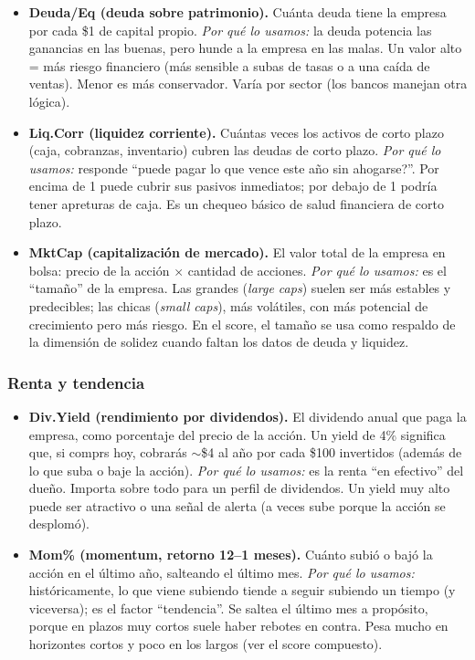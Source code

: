 \documentclass[11pt,a4paper]{article}
\begin{document}
\begin{itemize}[leftmargin=1.4em]
  \item \textbf{Deuda/Eq (deuda sobre patrimonio).} Cu\'anta deuda tiene la empresa por
  cada \$1 de capital propio. \emph{Por qu\'e lo usamos:} la deuda potencia las
  ganancias en las buenas, pero hunde a la empresa en las malas. Un valor alto = m\'as
  riesgo financiero (m\'as sensible a subas de tasas o a una ca\'ida de ventas). Menor
  es m\'as conservador. Var\'ia por sector (los bancos manejan otra l\'ogica).
  \item \textbf{Liq.Corr (liquidez corriente).} Cu\'antas veces los activos de corto
  plazo (caja, cobranzas, inventario) cubren las deudas de corto plazo. \emph{Por qu\'e
  lo usamos:} responde ``\textquestiondown{}puede pagar lo que vence este a\~no sin ahogarse?''.
  Por encima de 1 puede cubrir sus pasivos inmediatos; por debajo de 1 podr\'ia tener
  apreturas de caja. Es un chequeo b\'asico de salud financiera de corto plazo.
  \item \textbf{MktCap (capitalizaci\'on de mercado).} El valor total de la empresa en
  bolsa: precio de la acci\'on $\times$ cantidad de acciones. \emph{Por qu\'e lo
  usamos:} es el ``tama\~no'' de la empresa. Las grandes (\emph{large caps}) suelen ser
  m\'as estables y predecibles; las chicas (\emph{small caps}), m\'as vol\'atiles, con
  m\'as potencial de crecimiento pero m\'as riesgo. En el score, el tama\~no se usa como
  respaldo de la dimensi\'on de solidez cuando faltan los datos de deuda y liquidez.
\end{itemize}

\subsubsection*{Renta y tendencia}

\begin{itemize}[leftmargin=1.4em]
  \item \textbf{Div.Yield (rendimiento por dividendos).} El dividendo anual que paga la
  empresa, como porcentaje del precio de la acci\'on. Un yield de 4\% significa que, si
  comprs hoy, cobrar\'as $\sim$\$4 al a\~no por cada \$100 invertidos (adem\'as de lo que
  suba o baje la acci\'on). \emph{Por qu\'e lo usamos:} es la renta ``en efectivo'' del
  due\~no. Importa sobre todo para un perfil de dividendos. Un yield muy alto puede ser
  atractivo o una se\~nal de alerta (a veces sube porque la acci\'on se desplom\'o).
  \item \textbf{Mom\% (momentum, retorno 12--1 meses).} Cu\'anto subi\'o o baj\'o la
  acci\'on en el \'ultimo a\~no, salteando el \'ultimo mes. \emph{Por qu\'e lo usamos:}
  hist\'oricamente, lo que viene subiendo tiende a seguir subiendo un tiempo (y
  viceversa); es el factor ``tendencia''. Se saltea el \'ultimo mes a prop\'osito,
  porque en plazos muy cortos suele haber rebotes en contra. Pesa mucho en horizontes
  cortos y poco en los largos (ver el score compuesto).
\end{itemize}
\end{document}
